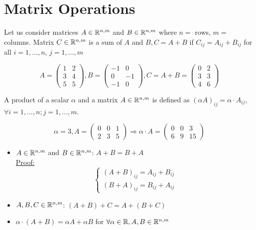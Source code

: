 \section{Matrix Operations}
\begin{definition}
Let us consider matrices $A\in\mathbb{R}^{n,m}$ and $B\in\mathbb{R}^{n,m}$ where $n=$ rows, $m=$ columns. Matrix $C\in\mathbb{R}^{n,m}$ is a sum of $A$ and $B, C=A+B$ if $C_{ij} = A_{ij}+B_{ij}$ for all $i=1,\dots,n$, $j=1,\dots,m$
\end{definition}
\begin{example}
\[
A = \begin{pmatrix}
1 & 2\\
3 & 4\\
5 & 5
\end{pmatrix}, B = \begin{pmatrix}
-1 & 0\\
0 & -1\\
-1 & 0
\end{pmatrix}, C = A+B = \begin{pmatrix}
0 & 2\\
3 & 3\\
4 & 6
\end{pmatrix}
\]	
\end{example}
\begin{definition}
A product of a scalar $\alpha$ and a matrix $A\in\mathbb{R}^{n,m}$ is defined as $\left( \alpha A\right)_{ij} = \alpha\cdot A_{ij}$, $\forall i=1,\dots,n; j=1,\dots,m$.
\end{definition}
\begin{example}
\[\alpha = 3,A = \begin{pmatrix}
0 & 0 & 1\\
2 & 3 & 5	
\end{pmatrix}\Rightarrow \alpha\cdot A = \begin{pmatrix}
0 & 0 & 3\\
6 & 9 & 15
\end{pmatrix}
\]	
\end{example}
\begin{properties}
\begin{itemize}
\item $A\in\mathbb{R}^{n,m}$ and $B\in\mathbb{R}^{n,m}$: $A+B = B+A$\\
\ul{Proof:} 
\[
\begin{cases}
\left( A+B \right)_{ij} = A_{ij}+B_{ij}\\
\left( B+A \right)_{ij} = B_{ij}+A_{ij}
\end{cases}
\]
\item $A,B,C\in\mathbb{R}^{n,m}$: $(A+B)+C = A+(B+C)$
\item $\alpha\cdot (A+B) = \alpha A+\alpha B$ for $\forall \alpha\in\mathbb{R}, A,B\in\mathbb{R}^{n,m}$
\end{itemize}
	
\end{properties}

